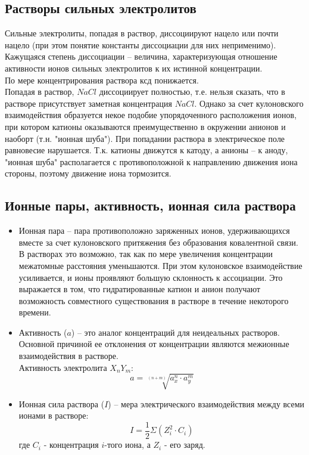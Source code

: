 \documentclass[14pt,a4paper]{scrartcl}
\begin{document}
\subsection*{Растворы сильных электролитов}
Сильные электролиты, попадая в раствор, диссоциируют нацело или почти нацело (при этом понятие константы диссоциации для них неприменимо). \\
Кажущаяся степень диссоциации -- величина, характеризующая отношение активности ионов сильных электролитов к их истинной концентрации. \\
По мере концентрирования раствора ксд понижается. \\
Попадая в раствор, $NaCl$ диссоциирует полностью, т.е. нельзя сказать, что в растворе присутствует заметная концентрация $NaCl$. Однако за счет кулоновского взаимодействия образуется некое подобие упорядоченного расположения ионов, при котором катионы оказываются преимущественно в окружении анионов и наоборт (т.н. "ионная шуба"). При попадании раствора в электрическое поле равновесие нарушается. Т.к. катионы движутся к катоду, а анионы -- к аноду, "ионная шуба" располагается с противоположной к направлению движения иона стороны, поэтому движение иона тормозится.
\subsection*{Ионные пары, активность, ионная сила раствора}
\begin{itemize}
	\item Ионная пара -- пара противоположно заряженных ионов, удерживающихся вместе за счет кулоновского притяжения без образования ковалентной связи. \\
	В растворах это возможно, так как по мере увеличения концентрации межатомные расстояния уменьшаются. При этом кулоновское взаимодействие усиливается, и ионы проявляют большую склонность к ассоциации. Это выражается в том, что гидратированные катион и анион получают возможность совместного существования в растворе в течение некоторого времени. \\
	\item Активность ($a$) -- это аналог концентраций для неидеальных растворов. Основной причиной ее отклонения от концентрации являются межионные взаимодействия в растворе. \\
	Активность электролита $X_nY_m$:	
	$$ a = \sqrt[(n+m)]{a_x^n \cdot a_y^m} $$
	\item Ионная сила раствора ($I$) -- мера электрического взаимодействия между всеми ионами в растворе:
	$$ I = \dfrac{1}{2} \Sigma(Z_i^2 \cdot C_i) $$
	где  $C_i $ - концентрация $i$-того иона, а $Z_i $ - его заряд.
\end{itemize}
\end{document}
